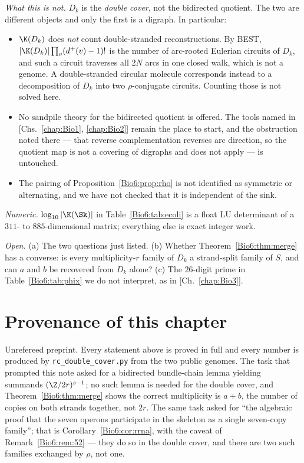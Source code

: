 \emph{What this is not.} $D_k$ is the \emph{double cover}, not the bidirected quotient.
The two are different objects and only the first is a digraph. In particular:
\begin{itemize}
\item $\K(D_k)$ does \emph{not} count double-stranded reconstructions. By BEST,
$|\K(D_k)|\prod_v(d^{+}(v)-1)!$ is the number of arc-rooted Eulerian circuits of $D_k$,
and such a circuit traverses all $2N$ arcs in one closed walk, which is not a genome. A
double-stranded circular molecule corresponds instead to a decomposition of $D_k$ into two
$\rho$-conjugate circuits. Counting those is not solved here.
\item No sandpile theory for the bidirected quotient is offered. The tools
\cite{Zaslavsky} named in [Chs.~\ref{chap:Bio1}, \ref{chap:Bio2}] remain the place to start, and the obstruction
noted there --- that reverse complementation reverses arc direction, so the quotient map
is not a covering of digraphs and \cite{RT} does not apply --- is untouched.
\item The pairing of Proposition~\ref{Bio6:prop:rho} is not identified as symmetric or
alternating, and we have not checked that it is independent of the sink.
\end{itemize}

\emph{Numeric.} $\log_{10}|\K(\Sk)|$ in Table~\ref{Bio6:tab:ecoli} is a float LU determinant of
a $311$- to $885$-dimensional matrix; everything else is exact integer work.

\emph{Open.} (a) The two questions just listed. (b) Whether
Theorem~\ref{Bio6:thm:merge} has a converse: is every multiplicity-$r$ family of $D_k$ a
strand-split family of $S$, and can $a$ and $b$ be recovered from $D_k$ alone?
(c) The $26$-digit prime in Table~\ref{Bio6:tab:phix} we do not interpret, as in [Ch.~\ref{chap:Bio3}].

\section*{Provenance of this chapter}

Unrefereed preprint. Every statement above is proved in full and every number is produced
by \texttt{rc\_double\_cover.py} from the two public genomes. The task that prompted this
note asked for a bidirected bundle-chain lemma yielding summands
$(\Z/2r)^{s-1}$; no such lemma is needed for the double cover, and
Theorem~\ref{Bio6:thm:merge} shows the correct multiplicity is $a+b$, the number of copies on
both strands together, not $2r$. The same task asked for ``the algebraic proof that the
seven operons participate in the skeleton as a single seven-copy family''; that is
Corollary~\ref{Bio6:cor:rrna}, with the caveat of Remark~\ref{Bio6:rem:52} --- they do so in the
double cover, and there are two such families exchanged by $\rho$, not one.
